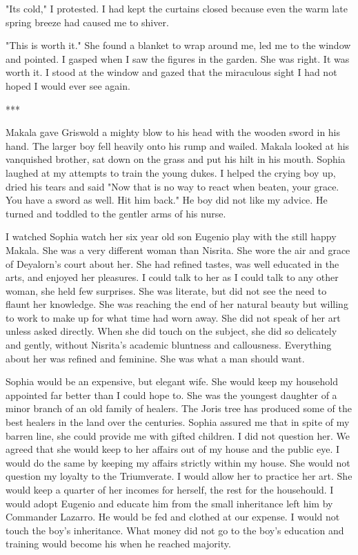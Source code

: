 \documentclass{article}
\begin{document}
"Its cold," I protested. I had kept the curtains closed because even the warm late spring breeze had caused me to shiver.

"This is worth it." She found a blanket to wrap around me, led me to the window and pointed. I gasped when I saw the figures in the garden. She was right. It was worth it. I stood at the window and gazed that the miraculous sight I had not hoped I would ever see again.

\vspace{.5cm}
***

Makala gave Griswold a mighty blow to his head with the wooden sword in his hand. The larger boy fell heavily onto his rump and wailed. Makala looked at his vanquished brother, sat down on the grass and put his hilt in his mouth. Sophia laughed at my attempts to train the young dukes. I helped the crying boy up, dried his tears and said "Now that is no way to react when beaten, your grace. You have a sword as well. Hit him back." He boy did not like my advice. He turned and toddled to the gentler arms of his nurse.

I watched Sophia watch her six year old son Eugenio play with the still happy Makala. She was a very different woman than Nisrita. She wore the air and grace of Deyalorn's court about her. She had refined tastes, was well educated in the arts, and enjoyed her pleasures. I could talk to her as I could talk to any other woman, she held few surprises. She was literate, but did not see the need to flaunt her knowledge. She was reaching the end of her natural beauty but willing to work to make up for what time had worn away. She did not speak of her art unless asked directly. When she did touch on the subject, she did so delicately and gently, without Nisrita's academic bluntness and callousness. Everything about her was refined and feminine. She was what a man should want.

Sophia would be an expensive, but elegant wife.  She would keep my household appointed far better than I could hope to. She was the youngest daughter of a minor branch of an old family of healers. The Joris tree has produced some of the best healers in the land over the centuries. Sophia assured me that in spite of my barren line, she could provide me with gifted children. I did not question her. We agreed that she would keep to her affairs out of my house and the public eye. I would do the same by keeping my affairs strictly within my house. She would not question my loyalty to the Triumverate. I would allow her to practice her art. She would keep a quarter of her incomes for herself, the rest for the househould. I would adopt Eugenio and educate him from the small inheritance left him by Commander Lazarro. He would be fed and clothed at our expense. I would not touch the boy's inheritance. What money did not go to the boy's education and training would become his when he reached majority. 
\end{document}

